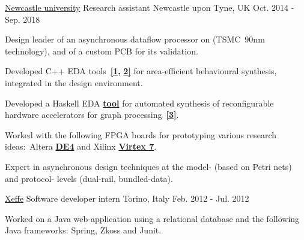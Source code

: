 
\begin{cventries}

\cventry
{\href{https://www.ncl.ac.uk/}{\color{myblue}Newcastle university}}
{Research assistant} %
{Newcastle upon Tyne, UK} %
{Oct. 2014 - Sep. 2018} %
{ 
\begin{cvitems}
\item {Design leader of an asynchronous dataflow processor on
\href{https://ieeexplore.ieee.org/document/8342264/}{}
(TSMC~90nm technology), and of a custom PCB for its validation.}
\item {Developed C++ EDA
tools~{\color{myblue}\href{https://github.com/tuura/shutters}{\textbf{[1}}}{\color{myblue}\textbf{,}}
{\color{myblue}\href{https://github.com/tuura/scenco}{\textbf{2]}}}
for area-efficient behavioural synthesis, integrated in the
\href{https://workcraft.org/}{}
design environment.}
\item {Developed a Haskell EDA 
{\color{myblue}\href{https://github.com/tuura/fantasi/tree/master/doc}{\textbf{tool}}}
for automated synthesis of reconfigurable hardware accelerators for graph
processing~{\color{myblue}\href{https://poets-project.org/publications}{\textbf{[3]}}}.}
\item {Worked with the following FPGA boards for prototyping various research 
ideas:~Altera 	
{\color{myblue}\href{https://www.altera.com/solutions/partners/partner-profile/terasic-inc-/board/de4-stratix-iv-development-board.html\#overview}{\textbf{DE4}}}
and Xilinx 	
{\color{myblue}\href{https://www.xilinx.com/products/boards-and-kits/ek-v7-vc707-g.html}{\textbf{Virtex
 7}}}.}
\item {Expert in asynchronous design techniques at the model- (based on 
Petri nets) and protocol- levels (dual-rail, bundled-data).}
\end{cvitems}
}


\cventry
{\color{myblue}\href{http://www.xeffe.it/}{Xeffe}}
{Software developer intern}
{Torino, Italy}
{Feb. 2012 - Jul. 2012}
{
\begin{cvitems}
Worked on a Java web-application using a relational database and 
the following Java frameworks: Spring, Zkoss and Junit.
\end{cvitems}
}


\end{cventries}
\vspace{-2mm}